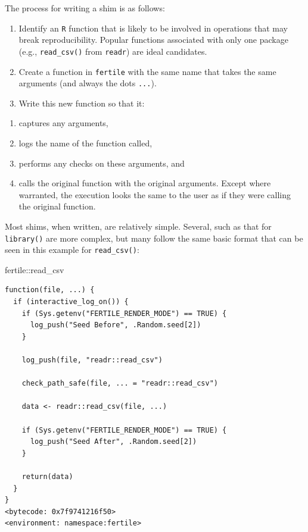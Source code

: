 \documentclass[12pt,twoside]{reedthesis}
\newenvironment{Shaded}{\begin{snugshade}}{\end{snugshade}}
\newcommand{\NormalTok}[1]{#1}
\newcommand{\SpecialCharTok}[1]{\textcolor[rgb]{0.00,0.00,0.00}{#1}}
\providecommand{\tightlist}{%
  \setlength{\itemsep}{0pt}\setlength{\parskip}{0pt}}
\begin{document}
The process for writing a shim is as follows:
\begin{enumerate}
\def\labelenumi{\arabic{enumi}.}
\item
  Identify an \texttt{R} function that is likely to be involved in operations that may break reproducibility. Popular functions associated with only one package (e.g., \texttt{read\_csv()} from \texttt{readr}) are ideal candidates.
\item
  Create a function in \texttt{fertile} with the same name that takes the same arguments (and always the dots \texttt{...}).
\item
  Write this new function so that it:
\end{enumerate}
\begin{enumerate}
\def\labelenumi{\alph{enumi})}
\tightlist
\item
  captures any arguments,
\item
  logs the name of the function called,
\item
  performs any checks on these arguments, and
\item
  calls the original function with the original arguments. Except where warranted, the execution looks the same to the user as if they were calling the original function.
\end{enumerate}
Most shims, when written, are relatively simple. Several, such as that for \texttt{library()} are more complex, but many follow the same basic format that can be seen in this example for \texttt{read\_csv()}:
\begin{Shaded}
\begin{Highlighting}[]
\NormalTok{fertile}\SpecialCharTok{::}\NormalTok{read\_csv}
\end{Highlighting}
\end{Shaded}
\begin{verbatim}
function(file, ...) {
  if (interactive_log_on()) {
    if (Sys.getenv("FERTILE_RENDER_MODE") == TRUE) {
      log_push("Seed Before", .Random.seed[2])
    }

    log_push(file, "readr::read_csv")

    check_path_safe(file, ... = "readr::read_csv")

    data <- readr::read_csv(file, ...)

    if (Sys.getenv("FERTILE_RENDER_MODE") == TRUE) {
      log_push("Seed After", .Random.seed[2])
    }

    return(data)
  }
}
<bytecode: 0x7f9741216f50>
<environment: namespace:fertile>
\end{verbatim}
\end{document}
